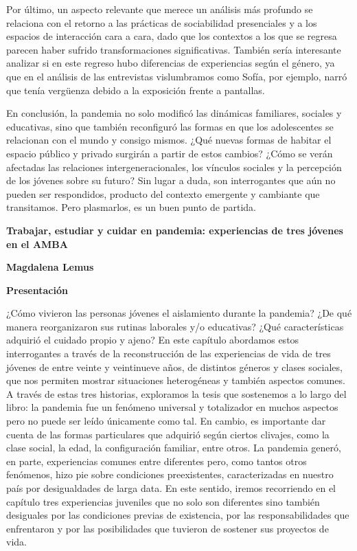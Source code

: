 Por último, un aspecto relevante que merece un análisis más profundo se relaciona con el retorno a las prácticas de sociabilidad presenciales y a los espacios de interacción cara a cara, dado que los contextos a los que se regresa parecen haber sufrido transformaciones significativas. También sería interesante analizar si en este regreso hubo diferencias de experiencias según el género, ya que en el análisis de las entrevistas vislumbramos como Sofía, por ejemplo, narró que tenía vergüenza debido a la exposición frente a pantallas.

En conclusión, la pandemia no solo modificó las dinámicas familiares, sociales y educativas, sino que también reconfiguró las formas en que los adolescentes se relacionan con el mundo y consigo mismos. ¿Qué nuevas formas de habitar el espacio público y privado surgirán a partir de estos cambios? ¿Cómo se verán afectadas las relaciones intergeneracionales, los vínculos sociales y la percepción de los jóvenes sobre su futuro? Sin lugar a duda, son interrogantes que aún no pueden ser respondidos, producto del contexto emergente y cambiante que transitamos. Pero plasmarlos, es un buen punto de partida.

\textbf{Trabajar, estudiar y cuidar en pandemia: experiencias de tres jóvenes en el AMBA}

\textbf{Magdalena Lemus}

\textbf{Presentación}

¿Cómo vivieron las personas jóvenes el aislamiento durante la pandemia? ¿De qué manera reorganizaron sus rutinas laborales y/o educativas? ¿Qué características adquirió el cuidado propio y ajeno? En este capítulo abordamos estos interrogantes a través de la reconstrucción de las experiencias de vida de tres jóvenes de entre veinte y veintinueve años, de distintos géneros y clases sociales, que nos permiten mostrar situaciones heterogéneas y también aspectos comunes. A través de estas tres historias, exploramos la tesis que sostenemos a lo largo del libro: la pandemia fue un fenómeno universal y totalizador en muchos aspectos pero no puede ser leído únicamente como tal. En cambio, es importante dar cuenta de las formas particulares que adquirió según ciertos clivajes, como la clase social, la edad, la configuración familiar, entre otros. La pandemia generó, en parte, experiencias comunes entre diferentes pero, como tantos otros fenómenos, hizo pie sobre condiciones preexistentes, caracterizadas en nuestro país por desigualdades de larga data. En este sentido, iremos recorriendo en el capítulo tres experiencias juveniles que no solo son diferentes sino también desiguales por las condiciones previas de existencia, por las responsabilidades que enfrentaron y por las posibilidades que tuvieron de sostener sus proyectos de vida.

